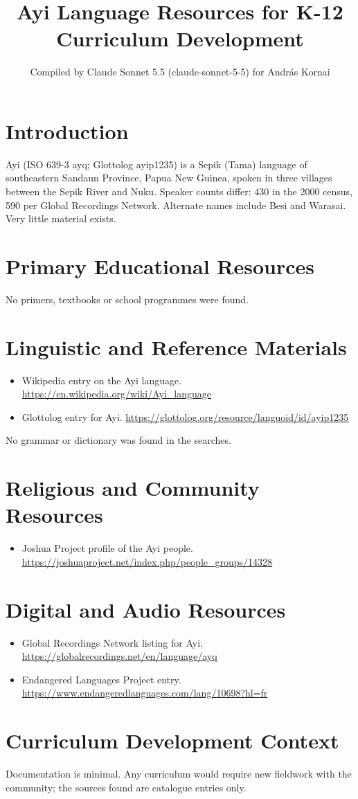 \documentclass[12pt]{article}
\title{Ayi Language Resources for K-12 Curriculum Development}
\author{Compiled by Claude Sonnet 5.5 (claude-sonnet-5-5) for Andr\'as Kornai}
\date{}
\begin{document}
\maketitle

\section{Introduction}
Ayi (ISO 639-3 ayq; Glottolog ayip1235) is a Sepik (Tama) language of southeastern Sandaun Province, Papua New Guinea, spoken in three villages between the Sepik River and Nuku. Speaker counts differ: 430 in the 2000 census, 590 per Global Recordings Network. Alternate names include Besi and Warasai. Very little material exists.

\section{Primary Educational Resources}
No primers, textbooks or school programmes were found.

\section{Linguistic and Reference Materials}
\begin{itemize}
\item Wikipedia entry on the Ayi language. \url{https://en.wikipedia.org/wiki/Ayi_language}
\item Glottolog entry for Ayi. \url{https://glottolog.org/resource/languoid/id/ayip1235}
\end{itemize}
No grammar or dictionary was found in the searches.

\section{Religious and Community Resources}
\begin{itemize}
\item Joshua Project profile of the Ayi people. \url{https://joshuaproject.net/index.php/people_groups/14328}
\end{itemize}

\section{Digital and Audio Resources}
\begin{itemize}
\item Global Recordings Network listing for Ayi. \url{https://globalrecordings.net/en/language/ayq}
\item Endangered Languages Project entry. \url{https://www.endangeredlanguages.com/lang/10698?hl=fr}
\end{itemize}

\section{Curriculum Development Context}
Documentation is minimal. Any curriculum would require new fieldwork with the community; the sources found are catalogue entries only.
\end{document}
